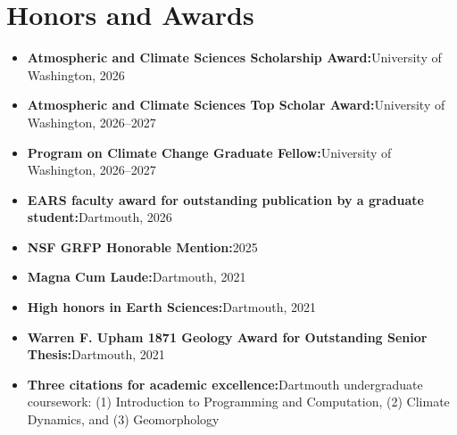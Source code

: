 \documentclass[a4paper,11pt]{article}
\newcommand{\resumeItem}[2]{
  \item{
    \textbf{#1}{\hspace{0.5mm}#2 \vspace{-0.5mm}}
  }
}
\newcommand{\resumeSubItem}[2]{\resumeItem{#1}{#2}\vspace{-4pt}}
\newcommand{\resumeHeadingSkillStart}{\begin{itemize}[leftmargin=*,itemsep=1.7mm, rightmargin=2ex]}
\newcommand{\resumeHeadingSkillEnd}{\end{itemize}}
\begin{document}
\section{\textbf{Honors and Awards}}
\resumeHeadingSkillStart
  \resumeSubItem{Atmospheric and Climate Sciences Scholarship Award:}
    {University of Washington, 2026}
  \resumeSubItem{Atmospheric and Climate Sciences Top Scholar Award:}
    {University of Washington, 2026--2027}
  \resumeSubItem{Program on Climate Change Graduate Fellow:}
    {University of Washington, 2026--2027}
  \resumeSubItem{EARS faculty award for outstanding publication by a graduate student:}
    {Dartmouth, 2026}
  \resumeSubItem{NSF GRFP Honorable Mention:}
    {2025}
  \resumeSubItem{Magna Cum Laude:}
    {Dartmouth, 2021}
  \resumeSubItem{High honors in Earth Sciences:}
    {Dartmouth, 2021}
  \resumeSubItem{Warren F. Upham 1871 Geology Award for Outstanding Senior Thesis:}
    {Dartmouth, 2021}
  \resumeSubItem{Three citations for academic excellence:}
    {Dartmouth undergraduate coursework: (1) Introduction to Programming and Computation, (2) Climate Dynamics, and (3) Geomorphology}
\resumeHeadingSkillEnd
\end{document}
